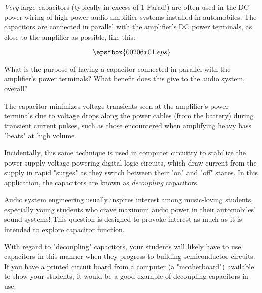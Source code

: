 

{\it Very} large capacitors (typically in excess of 1 Farad!) are often used in the DC power wiring of high-power audio amplifier systems installed in automobiles.  The capacitors are connected in parallel with the amplifier's DC power terminals, as close to the amplifier as possible, like this:

$$\epsfbox{00206x01.eps}$$

What is the purpose of having a capacitor connected in parallel with the amplifier's power terminals?  What benefit does this give to the audio system, overall?







The capacitor minimizes voltage transients seen at the amplifier's power terminals due to voltage drops along the power cables (from the battery) during transient current pulses, such as those encountered when amplifying heavy bass "beats" at high volume.

Incidentally, this same technique is used in computer circuitry to stabilize the power supply voltage powering digital logic circuits, which draw current from the supply in rapid "surges" as they switch between their "on" and "off" states.  In this application, the capacitors are known as {\it decoupling} capacitors.







Audio system engineering usually inspires interest among music-loving students, especially young students who crave maximum audio power in their automobiles' sound systems!  This question is designed to provoke interest as much as it is intended to explore capacitor function.

With regard to "decoupling" capacitors, your students will likely have to use capacitors in this manner when they progress to building semiconductor circuits.  If you have a printed circuit board from a computer (a "motherboard") available to show your students, it would be a good example of decoupling capacitors in use.





